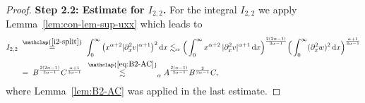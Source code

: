 \documentclass[reqno,12pt]{amsart}
\renewcommand{\d}{\ensuremath{\mathrm{d}}}
\renewcommand{\d}{\ensuremath{{\rm d}}}
\numberwithin{equation}{section}
\begin{document}
\begin{proof}
\noindent\textbf{Step 2.2: Estimate for $I_{2,2}$. }
For the integral $I_{2,2}$ we apply  Lemma~\ref{lem:con-lem-sup-uxx} which leads to
%
\begin{align} \nonumber
    I_{2,2}
    \; &\stackrel{\mathclap{\eqref{i2-split}}}{=} \;
    \int_0^\infty \big(x^{\alpha+2} |\partial_x^2 v|^{\alpha+1}\big)^2\, \d x \lesssim_\alpha %
    \Big(\int_0^\infty x^{\alpha +2} \, |\partial_x^2 v|^{\alpha +1} \, \d x\Big)^{\frac{2(2\alpha-1)}{3\alpha-1}}
    \Big( \int_0^\infty (\partial_x^2 w)^2 \, \d x\Big)^{\frac{\alpha+1}{3\alpha-1}} \\
    &= \;
    B^{\frac{2(2\alpha-1)}{3\alpha-1}}
    C^{\frac{\alpha+1}{3\alpha-1}}  \;\, \stackrel{\mathclap{\eqref{eq:B2-AC}}}{\lesssim}_\alpha A^\frac{2(\alpha-1)}{3\alpha-1}
    B^\frac{2}{3\alpha-1}
    C, \label{nonlinear-i22}
\end{align}
%
where Lemma~\ref{lem:B2-AC} was applied in the last estimate.

%
\bigskip
%


\end{proof}
\end{document}
